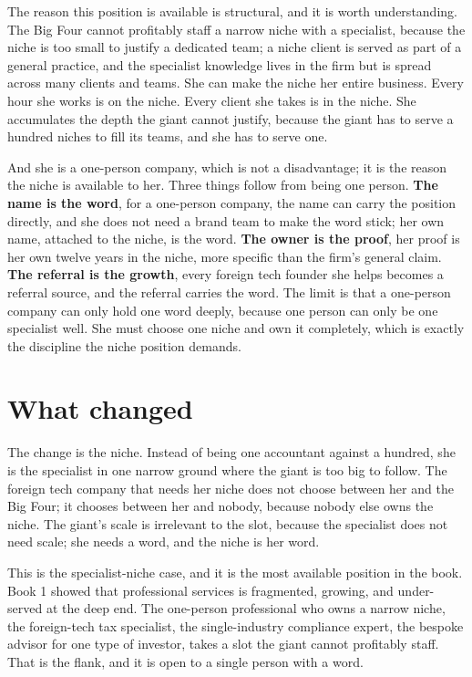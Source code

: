 \documentclass[10pt,twoside,openany]{memoir}
\newcommand{\needspacehead}{\needspace{4\baselineskip}}
\let\oldsection\section
\renewcommand{\section}{\needspacehead\oldsection}
\begin{document}
{The reason this position is available is structural, and it is worth
understanding. The Big Four cannot profitably staff a narrow niche with
a specialist, because the niche is too small to justify a dedicated
team; a niche client is served as part of a general practice, and the
specialist knowledge lives in the firm but is spread across many clients
and teams. She can make the niche her entire business. Every hour she
works is on the niche. Every client she takes is in the niche. She
accumulates the depth the giant cannot justify, because the giant has to
serve a hundred niches to fill its teams, and she has to serve one.

And she is a one-person company, which is not a disadvantage; it is the
reason the niche is available to her. Three things follow from being one
person. \textbf{The name is the word}, for a one-person company, the
name can carry the position directly, and she does not need a brand team
to make the word stick; her own name, attached to the niche, is the
word. \textbf{The owner is the proof}, her proof is her own twelve years
in the niche, more specific than the firm's general claim. \textbf{The
referral is the growth}, every foreign tech founder she helps becomes a
referral source, and the referral carries the word. The limit is that a
one-person company can only hold one word deeply, because one person can
only be one specialist well. She must choose one niche and own it
completely, which is exactly the discipline the niche position demands.

\section{What changed}\label{what-changed-3}

The change is the niche. Instead of being one accountant against a
hundred, she is the specialist in one narrow ground where the giant is
too big to follow. The foreign tech company that needs her niche does
not choose between her and the Big Four; it chooses between her and
nobody, because nobody else owns the niche. The giant's scale is
irrelevant to the slot, because the specialist does not need scale; she
needs a word, and the niche is her word.

This is the specialist-niche case, and it is the most available position
in the book. Book 1 showed that professional services is fragmented,
growing, and under-served at the deep end. The one-person professional
who owns a narrow niche, the foreign-tech tax specialist, the
single-industry compliance expert, the bespoke advisor for one type of
investor, takes a slot the giant cannot profitably staff. That is the
flank, and it is open to a single person with a word.

}
\end{document}
